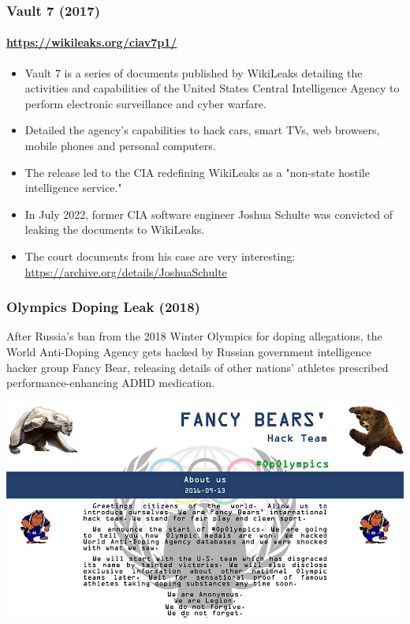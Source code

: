 \documentclass[aspectratio=169,usenames,dvipsnames]{beamer}
\begin{document}
\begin{frame}
  \frametitle{Vault 7 (2017)}
  \framesubtitle{\url{https://wikileaks.org/ciav7p1/}}

  \begin{itemize}[<+->]
    \item Vault 7 is a series of documents published by WikiLeaks detailing
      the activities and capabilities of the United States Central
      Intelligence Agency to perform electronic surveillance and cyber
      warfare.
    \item Detailed the agency's capabilities to hack cars, smart TVs, web
      browsers, mobile phones and personal computers.
    \item The release led to the CIA redefining WikiLeaks as a "non-state
      hostile intelligence service."
    \item In July 2022, former CIA software engineer Joshua Schulte was
      convicted of leaking the documents to WikiLeaks.
    \item The court documents from his case are very interesting:
      \url{https://archive.org/details/JoshuaSchulte}
  \end{itemize}

\end{frame}
\begin{frame}
  \frametitle{Olympics Doping Leak (2018)}

  After Russia's ban from the 2018 Winter Olympics for doping
  allegations, the World Anti-Doping Agency gets hacked by Russian government
  intelligence hacker group Fancy Bear, releasing details of other nations'
  athletes prescribed performance-enhancing ADHD medication.

  \vspace{5mm}

  \centering
  \includegraphics[width=\textwidth,height=0.5\textheight,keepaspectratio]{img/fancy_bear.jpg}

\end{frame}
\end{document}
